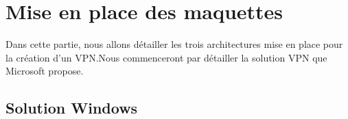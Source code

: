 \section{Mise en place des maquettes}

	Dans cette partie, nous allons détailler les trois architectures mise en place pour la création d'un VPN.Nous commenceront par détailler la solution VPN que Microsoft propose.

\subsection{Solution Windows}


% 






\pagebreak
